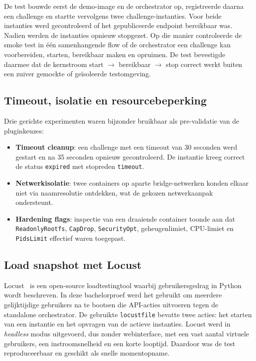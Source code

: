 De test bouwde eerst de demo-image en de orchestrator op, registreerde daarna een challenge en startte vervolgens twee challenge-instanties. Voor beide instanties werd gecontroleerd of het gepubliceerde endpoint bereikbaar was. Nadien werden de instanties opnieuw stopgezet. Op die manier controleerde de smoke test in één samenhangende flow of de orchestrator een challenge kan voorbereiden, starten, bereikbaar maken en opruimen. De test bevestigde daarmee dat de kernstroom start $\rightarrow$ bereikbaar $\rightarrow$ stop correct werkt buiten een zuiver gemockte of geïsoleerde testomgeving.

\subsection{Timeout, isolatie en resourcebeperking}

Drie gerichte experimenten waren bijzonder bruikbaar als pre-validatie van de pluginkeuzes:

\begin{itemize}
  \item \textbf{Timeout cleanup}: een challenge met een timeout van 30 seconden werd gestart en na 35 seconden opnieuw gecontroleerd. De instantie kreeg correct de status \texttt{expired} met stopreden \texttt{timeout}.
  \item \textbf{Netwerkisolatie}: twee containers op aparte bridge-netwerken konden elkaar niet via naamresolutie ontdekken, wat de gekozen netwerkaanpak ondersteunt.
  \item \textbf{Hardening flags}: inspectie van een draaiende container toonde aan dat \texttt{ReadonlyRootfs}, \texttt{CapDrop}, \texttt{SecurityOpt}, geheugenlimiet, CPU-limiet en \texttt{PidsLimit} effectief waren toegepast.
\end{itemize}

\subsection{Load snapshot met Locust}

Locust~\autocite{Locust} is een open-source loadtestingtool waarbij gebruikersgedrag in Python wordt beschreven. In deze bachelorproef werd het gebruikt om meerdere gelijktijdige gebruikers na te bootsen die API-acties uitvoeren tegen de standalone orchestrator. De gebruikte \texttt{locustfile} bevatte twee acties: het starten van een instantie en het opvragen van de actieve instanties. Locust werd in \textit{headless} modus uitgevoerd, dus zonder webinterface, met een vast aantal virtuele gebruikers, een instroomsnelheid en een korte looptijd. Daardoor was de test reproduceerbaar en geschikt als snelle momentopname.

